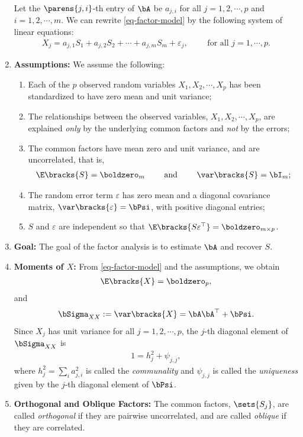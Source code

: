 \documentclass[12pt]{article}
\begin{document}
\begin{enumerate}[label=\textbf{\arabic*.}]
	Let the $\parens{j, i}$-th entry of $\bA$ be $a_{j, i}$ for all $j = 1, 2, \cdots, p$ and $i = 1, 2, \cdots, m$. We can rewrite \eqref{eq-factor-model} by the following system of linear equations: 
	\begin{align}
		X_j = a_{j,1} S_1 + a_{j,2} S_2 + \cdots + a_{j,m} S_m + \varepsilon_j, \qquad \text{ for all } j = 1, \cdots, p. 
	\end{align}
	
	\item \textbf{Assumptions:} We assume the following: 
	\begin{enumerate}
		\item Each of the $p$ observed random variables $X_1, X_2, \cdots, X_p$ has been standardized to have zero mean and unit variance; 
		\item The relationships between the observed variables, $X_1, X_2, \cdots, X_p$, are explained \emph{only} by the underlying common factors and \emph{not} by the errors; 
		\item The common factors have mean zero and unit variance, and are uncorrelated, that is, 
		\begin{align*}
			\E \bracks{S} = \boldzero_{m} \qquad \text{ and } \qquad \var \bracks{S} = \bI_m; 
		\end{align*}
		\item The random error term $\varepsilon$ has zero mean and a diagonal covariance matrix, $\var \bracks{\varepsilon} = \bPsi$, with positive diagonal entries; 
		\item $S$ and $\varepsilon$ are independent so that $\E \bracks{S \varepsilon^\top } = \boldzero_{m \times p}$. 
	\end{enumerate}
	
	\item \textbf{Goal:} The goal of the factor analysis is to estimate $\bA$ and recover $S$. 
	
	\item \textbf{Moments of $X$:} From \eqref{eq-factor-model} and the assumptions, we obtain 
	\begin{align}
		\E \bracks{X} = \boldzero_p, 
	\end{align}
	and 
	\begin{align}\label{eq-cov-mat}
		\bSigma_{XX} := \var \bracks{X} = \bA \bA^\top + \bPsi. 
	\end{align}
	Since $X_j$ has unit variance for all $j = 1, 2, \cdots, p$, the $j$-th diagonal element of $\bSigma_{XX}$ is 
	\begin{align}
		1 = h_j^2 + \psi_{j,j}, 
	\end{align}
	where $h_j^2 = \sum_{i} a_{j,i}^2$ is called the \emph{communality} and $\psi_{j,j}$ is called the \emph{uniqueness} given by the $j$-th diagonal element of $\bPsi$. 
	
	\item \textbf{Orthogonal and Oblique Factors:} The common factors, $\sets{S_j}$, are called \emph{orthogonal} if they are pairwise uncorrelated, and are called \emph{oblique} if they are correlated. 

\end{enumerate}
\end{document}
